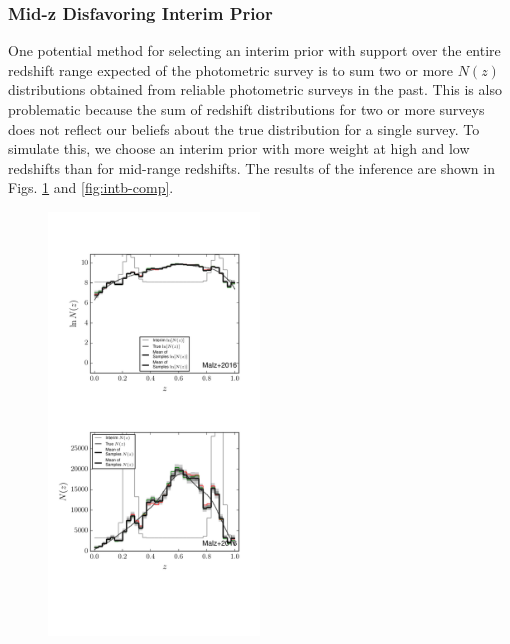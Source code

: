\documentclass[preprint]{aastex}
\begin{document}
\subsubsection{Mid-z Disfavoring Interim Prior}
\label{sec:midz}

One potential method for selecting an interim prior with support over the 
entire redshift range expected of the photometric survey is to sum two or more 
$N(z)$ distributions obtained from reliable photometric surveys in the past.  
This is also problematic because the sum of redshift distributions for two or 
more surveys does not reflect our beliefs about the true distribution for a 
single survey.  To simulate this, we choose an interim prior with more weight 
at high and low redshifts than for mid-range redshifts.  The results of the 
inference are shown in Figs. \ref{fig:intb-samp} and \ref{fig:intb-comp}.

\begin{figure}
\includegraphics[width=0.5\textwidth]{figs/bint/samps.pdf}
\caption{}
\label{fig:intb-samp}
\end{figure}
\end{document}
